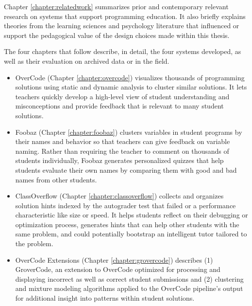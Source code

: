 Chapter \ref{chapter:relatedwork} summarizes prior and contemporary relevant research on systems that support programming education. It also briefly explains theories from the learning sciences and psychology literature that influenced or support the pedagogical value of the design choices made within this thesis.

The four chapters that follow describe, in detail, the four systems developed, as well as their evaluation on archived data or in the field.

\begin{itemize}
\item OverCode (Chapter \ref{chapter:overcode}) visualizes thousands of programming solutions using static and dynamic analysis to cluster similar solutions. It lets teachers quickly develop a high-level view of student understanding and misconceptions and provide feedback that is relevant to many student solutions. 

\item Foobaz (Chapter \ref{chapter:foobaz}) clusters variables in student programs by their names and behavior so that teachers can give feedback on variable naming. Rather than requiring the teacher to comment on thousands of students individually, Foobaz generates personalized quizzes that help students evaluate their own names by comparing them with good and bad names from other students. 

\item ClassOverflow (Chapter \ref{chapter:classoverflow}) collects and organizes solution hints indexed by the autograder test that failed or a performance characteristic like size or speed. It helps students reflect on their debugging or optimization process, generates hints that can help other students with the same problem, and could potentially bootstrap an intelligent tutor tailored to the problem.

\item OverCode Extensions (Chapter \ref{chapter:grovercode}) describes (1) GroverCode, an extension to OverCode optimized for processing and displaying incorrect as well as correct student submissions and (2) clustering and mixture modeling algorithms applied to the OverCode pipeline's output for additional insight into patterns within student solutions. %
\end{itemize}

